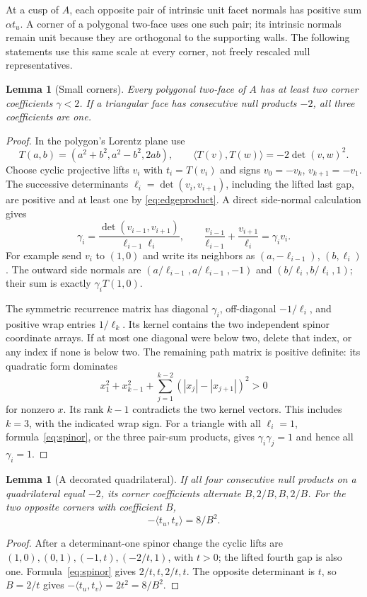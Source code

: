 \documentclass[11pt]{article}
\newtheorem{lemma}[theorem]{Lemma}
\theoremstyle{remark}
\newcommand{\ip}[2]{\langle #1,#2\rangle}
\begin{document}
At a cusp of $A$, each opposite pair of intrinsic unit facet normals
has positive sum $\alpha t_u$. A corner of a polygonal two-face uses
one such pair; its intrinsic normals remain unit because they are
orthogonal to the supporting walls. The following statements use this
same scale at every corner, not freely rescaled null representatives.

\begin{lemma}[Small corners]\label{lem:polygon}
Every polygonal two-face of $A$ has at least two corner coefficients
$\gamma<2$. If a triangular face has consecutive null products $-2$,
all three coefficients are one.
\end{lemma}
\begin{proof}
In the polygon's Lorentz plane use
\[
 T(a,b)=(a^2+b^2,a^2-b^2,2ab),\qquad
 \ip{T(v)}{T(w)}=-2\det(v,w)^2.
\]
Choose cyclic projective lifts $v_i$ with $t_i=T(v_i)$ and signs
$v_0=-v_k$, $v_{k+1}=-v_1$. The successive determinants
$\ell_i=\det(v_i,v_{i+1})$, including the lifted last gap, are positive
and at least one by \eqref{eq:edgeproduct}. A direct side-normal
calculation gives
\begin{equation}\label{eq:spinor}
 \gamma_i=\frac{\det(v_{i-1},v_{i+1})}{\ell_{i-1}\ell_i},\qquad
 \frac{v_{i-1}}{\ell_{i-1}}+
 \frac{v_{i+1}}{\ell_i}=\gamma_i v_i.
\end{equation}
For example send $v_i$ to $(1,0)$ and write its neighbors as
$(a,-\ell_{i-1})$, $(b,\ell_i)$. The outward side normals are
$(a/\ell_{i-1},a/\ell_{i-1},-1)$ and $(b/\ell_i,b/\ell_i,1)$;
their sum is exactly $\gamma_i T(1,0)$.

The symmetric recurrence matrix has diagonal $\gamma_i$, off-diagonal
$-1/\ell_i$, and positive wrap entries $1/\ell_k$. Its kernel contains
the two independent spinor coordinate arrays. If at most one diagonal
were below two, delete that index, or any index if none is below two.
The remaining path matrix is positive definite: its quadratic form
dominates
\[
 x_1^2+x_{k-1}^2+
 \sum_{j=1}^{k-2}(|x_j|-|x_{j+1}|)^2>0
\]
for nonzero $x$. Its rank $k-1$ contradicts the two kernel vectors.
This includes $k=3$, with the indicated wrap sign. For a triangle with
all $\ell_i=1$, formula~\eqref{eq:spinor}, or the three pair-sum
products, gives $\gamma_i\gamma_j=1$ and hence all $\gamma_i=1$.
\end{proof}

\begin{lemma}[A decorated quadrilateral]\label{lem:quad}
If all four consecutive null products on a quadrilateral equal $-2$,
its corner coefficients alternate $B,2/B,B,2/B$. For the two opposite
corners with coefficient $B$,
\begin{equation}\label{eq:quadopposite}
 -\ip{t_u}{t_v}=8/B^2.
\end{equation}
\end{lemma}
\begin{proof}
After a determinant-one spinor change the cyclic lifts are
$(1,0),(0,1),(-1,t),(-2/t,1)$, with $t>0$; the lifted fourth gap is
also one. Formula~\eqref{eq:spinor} gives $2/t,t,2/t,t$.
The opposite determinant is $t$, so $B=2/t$ gives
$-\ip{t_u}{t_v}=2t^2=8/B^2$.
\end{proof}
\end{document}
